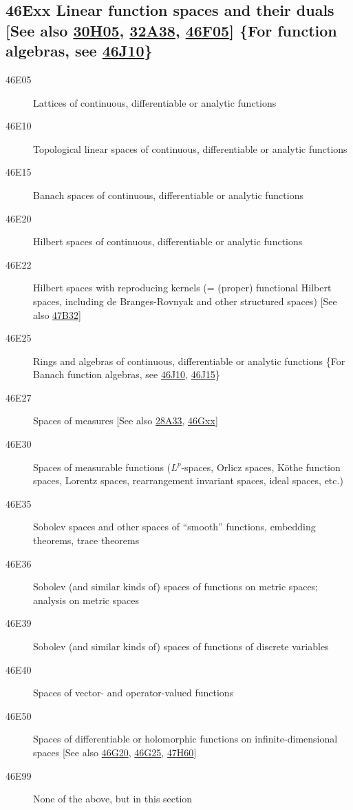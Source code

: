 \subsection*{46Exx  Linear function spaces and their duals [See also \hyperref[30H05]{30H05}, \hyperref[32A38]{32A38}, \hyperref[46F05]{46F05}] \{For function algebras, see \hyperref[46J10]{46J10}\} }\label{46Exx}
\begin{description}  
\item [46E05]\label{46E05} Lattices of continuous, differentiable or analytic functions
\item [46E10]\label{46E10} Topological linear spaces of continuous, differentiable or analytic functions
\item [46E15]\label{46E15} Banach spaces of continuous, differentiable or analytic functions
\item [46E20]\label{46E20} Hilbert spaces of continuous, differentiable or analytic functions
\item [46E22]\label{46E22} Hilbert spaces with reproducing kernels (= (proper) functional Hilbert spaces, including de Branges-Rovnyak and other structured spaces) [See also \hyperref[47B32]{47B32}]
\item [46E25]\label{46E25} Rings and algebras of continuous, differentiable or analytic functions \{For Banach function algebras, see \hyperref[46J10]{46J10}, \hyperref[46J15]{46J15}\}
\item [46E27]\label{46E27} Spaces of measures [See also \hyperref[28A33]{28A33}, \hyperref[46Gxx]{46Gxx}]
\item [46E30]\label{46E30} Spaces of measurable functions ($L^p$-spaces, Orlicz spaces, K\"{o}the function spaces, Lorentz spaces, rearrangement invariant spaces, ideal spaces, etc.)
\item [46E35]\label{46E35} Sobolev spaces and other spaces of ``smooth'' functions, embedding theorems, trace theorems
\item [46E36]\label{46E36} Sobolev (and similar kinds of) spaces of functions on metric spaces; analysis on metric spaces
\item [46E39]\label{46E39} Sobolev (and similar kinds of) spaces of functions of discrete variables
\item [46E40]\label{46E40} Spaces of vector- and operator-valued functions
\item [46E50]\label{46E50} Spaces of differentiable or holomorphic functions on infinite-dimensional spaces [See also \hyperref[46G20]{46G20}, \hyperref[46G25]{46G25}, \hyperref[47H60]{47H60}]
\item [46E99]\label{46E99} None of the above, but in this section
\end{description}
